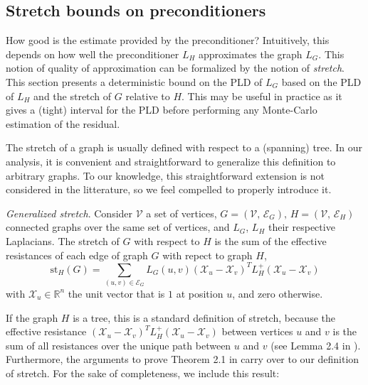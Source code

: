 
\subsection{Stretch bounds on preconditioners\label{sub:Stretch-bounds}}

How good is the estimate provided by the preconditioner? Intuitively,
this depends on how well the preconditioner $L_{H}$ approximates
the graph $L_{G}$. This notion of quality of approximation can be
formalized by the notion of \emph{stretch}. This section presents
a deterministic bound on the PLD of $L_{G}$ based on the PLD of $L_{H}$
and the stretch of $G$ relative to $H$. This may be useful in practice
as it gives a (tight) interval for the PLD before performing any Monte-Carlo
estimation of the residual.

The stretch of a graph is usually defined with respect to a (spanning)
tree. In our analysis, it is convenient and straightforward to generalize
this definition to arbitrary graphs. To our knowledge, this straightforward
extension is not considered in the litterature, so we feel compelled
to properly introduce it.

\begin{definition}\emph{Generalized stretch}.\label{Generalized-stretch}
Consider $\mathcal{V}$ a set of vertices, $G=\left(\mathcal{V},\,\mathcal{E}_{G}\right),\, H=\left(\mathcal{V},\,\mathcal{E}_{H}\right)$
connected graphs over the same set of vertices, and $L_{G}$, $L_{H}$
their respective Laplacians. The stretch of $G$ with respect to $H$
is the sum of the effective resistances of each edge of graph $G$
with repect to graph $H$, 
\[
\text{st}_{H}\left(G\right)=\sum_{\left(u,v\right)\in\mathcal{E}_{G}}L_{G}\left(u,v\right)\left(\mathcal{X}_{u}-\mathcal{X}_{v}\right)^{T}L_{H}^{+}\left(\mathcal{X}_{u}-\mathcal{X}_{v}\right)
\]
with $\mathcal{X}_{u}\in\mathbb{R}^{n}$ the unit vector that is $1$
at position $u$, and zero otherwise.

\end{definition}

If the graph $H$ is a tree, this is a standard definition of stretch,
because the effective resistance $\left(\mathcal{X}_{u}-\mathcal{X}_{v}\right)^{T}L_{H}^{+}\left(\mathcal{X}_{u}-\mathcal{X}_{v}\right)$
between vertices $u$ and $v$ is the sum of all resistances over
the unique path between $u$ and $v$ (see Lemma 2.4 in \cite{Spielman2009b}).
Furthermore, the arguments to prove Theorem 2.1 in \cite{Spielman2009b}
carry over to our definition of stretch. For the sake of completeness,
we include this result:

